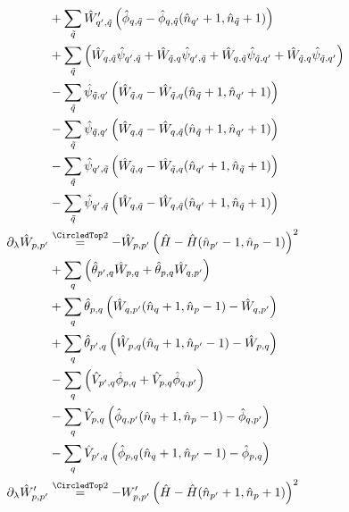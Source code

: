 \begin{appendix}
\begin{subequations}
\begin{align}
&+\Sum_{\tilde q}\hat W_{q^\prime,\tilde q}^\prime \left(\hat\phi_{q, \tilde q}-\hat\phi_{q, \tilde q}(\hat n_{q^\prime}+1,\hat n_{\tilde q}+1)\right) \nonumber\\
&+\Sum_{\tilde q} \left(\hat W_{q,\tilde q}\hat \psi_{q^\prime,\tilde q}+\hat W_{\tilde q,q}\hat \psi_{q^\prime,\tilde q}+\hat W_{q,\tilde q}\hat \psi_{\tilde q,q^\prime}  + \hat W_{\tilde q,q}\hat \psi_{\tilde q,q^\prime}\right) \nonumber\\
&- \Sum_{\tilde q}\hat \psi_{\tilde q,q^\prime} \left(\hat W_{ \tilde q,q}-\hat W_{ \tilde q,q}(\hat n_{\tilde q}+1,\hat n_{q^\prime}+1)\right)\nonumber\\
&-\Sum_{\tilde q}\hat \psi_{\tilde q,q^\prime} \left(\hat W_{q,\tilde q}-\hat W_{q,\tilde q}(\hat n_{\tilde q}+1,\hat n_{q^\prime}+1)\right) \nonumber\\
&-\Sum_{\tilde q}\hat \psi_{q^\prime,\tilde q} \left(\hat W_{\tilde q,q}-\hat W_{\tilde q,q}(\hat n_{q^\prime}+1,\hat n_{\tilde q}+1)\right) \nonumber\\
&-\Sum_{\tilde q}\hat \psi_{q^\prime,\tilde q} \left(\hat W_{q, \tilde q}-\hat W_{q, \tilde q}(\hat n_{q^\prime}+1,\hat n_{\tilde q}+1)\right) \nonumber\\
\partial_\lambda\hat W_{p,p^\prime}&\eqsec -\hat W_{p,p^\prime}\left(\hat H-\hat H(\hat n_{p^\prime}-1,\hat n_p -1)\right)^2\\
&+\Sum_{q}\left(\hat\theta_{ p^\prime, q}\hat W_{p,q}+\hat\theta_{ p,q}\hat W_{q,p^\prime}\right) \nonumber\\
&+  \Sum_{ q} \hat\theta_{ p,q}\left(\hat W_{q,p^\prime}(\hat n_{q}+1,\hat n_p-1)- \hat W_{q,p^\prime}\right)                         \nonumber\\
&+        \Sum_{ q} \hat\theta_{ p^\prime,q}\left(\hat W_{p,q}(\hat n_{q}+1,\hat n_{p^\prime}-1)- \hat W_{p,q}\right)                   \nonumber\\
&-       \Sum_{q}\left(\hat V_{ p^\prime, q}\hat \phi_{p,q}+\hat V_{ p,q}\hat \phi_{q,p^\prime}\right)                    \nonumber\\
&-         \Sum_{ q} \hat V_{ p,q}\left(\hat \phi_{q,p^\prime}(\hat n_{q}+1,\hat n_p-1)- \hat \phi_{q,p^\prime}\right)                  \nonumber\\
&-          \Sum_{ q} \hat V_{ p^\prime,q}\left(\hat \phi_{p,q}(\hat n_{q}+1,\hat n_{p^\prime}-1)- \hat \phi_{p,q}\right)                 \nonumber\\
\partial_\lambda\hat W_{p,p^\prime}^\prime&\eqsec -W_{p,p^\prime}^\prime\left(\hat H-\hat H(\hat n_{p^\prime}+1,\hat n_p +1)\right)^2\\

\end{align}
\end{subequations}
\end{appendix}
